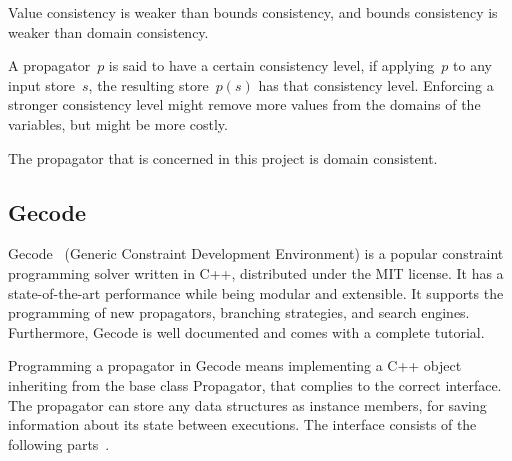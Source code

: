\documentclass[a4paper,11pt]{article}
\numberwithin{equation}{section}
\begin{document}
Value consistency is weaker than bounds consistency, and bounds consistency
is weaker than domain consistency.

A propagator~$p$ is said to have a certain consistency level,
if applying~$p$ to any input store~$s$, the resulting store~$p(s)$
has that consistency level. Enforcing a stronger consistency level might 
remove more values from the domains of the variables, but might be
more costly.

The propagator that is concerned in this project is domain consistent.

\subsection{Gecode}
\label{bg:gecode}
Gecode~\cite{Gecode} (Generic Constraint Development Environment)
is a popular constraint programming solver written in C++,
distributed under the MIT license.
It has a state-of-the-art performance while being modular and extensible.
It supports the programming of new propagators, branching strategies,
and search engines. Furthermore, Gecode is well documented and comes
with a complete tutorial.


Programming a propagator in Gecode means implementing a C++ object
inheriting from the base class Propagator,
that complies to the correct interface.
The propagator can store any data structures as instance members,
for saving information about its state between executions.
The interface consists of 
the following parts~\cite{Gecode:MPG}.
\end{document}
